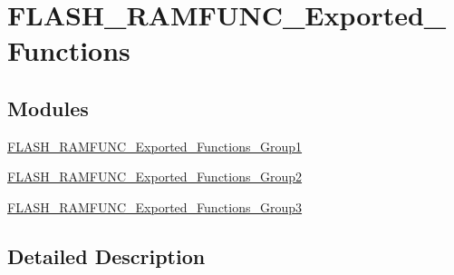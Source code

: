 \hypertarget{group___f_l_a_s_h___r_a_m_f_u_n_c___exported___functions}{\section{F\-L\-A\-S\-H\-\_\-\-R\-A\-M\-F\-U\-N\-C\-\_\-\-Exported\-\_\-\-Functions}
\label{group___f_l_a_s_h___r_a_m_f_u_n_c___exported___functions}
}
\subsection*{Modules}
\begin{DoxyCompactItemize}
\item 
\hyperlink{group___f_l_a_s_h___r_a_m_f_u_n_c___exported___functions___group1}{F\-L\-A\-S\-H\-\_\-\-R\-A\-M\-F\-U\-N\-C\-\_\-\-Exported\-\_\-\-Functions\-\_\-\-Group1}
\item 
\hyperlink{group___f_l_a_s_h___r_a_m_f_u_n_c___exported___functions___group2}{F\-L\-A\-S\-H\-\_\-\-R\-A\-M\-F\-U\-N\-C\-\_\-\-Exported\-\_\-\-Functions\-\_\-\-Group2}
\item 
\hyperlink{group___f_l_a_s_h___r_a_m_f_u_n_c___exported___functions___group3}{F\-L\-A\-S\-H\-\_\-\-R\-A\-M\-F\-U\-N\-C\-\_\-\-Exported\-\_\-\-Functions\-\_\-\-Group3}
\end{DoxyCompactItemize}


\subsection{Detailed Description}
